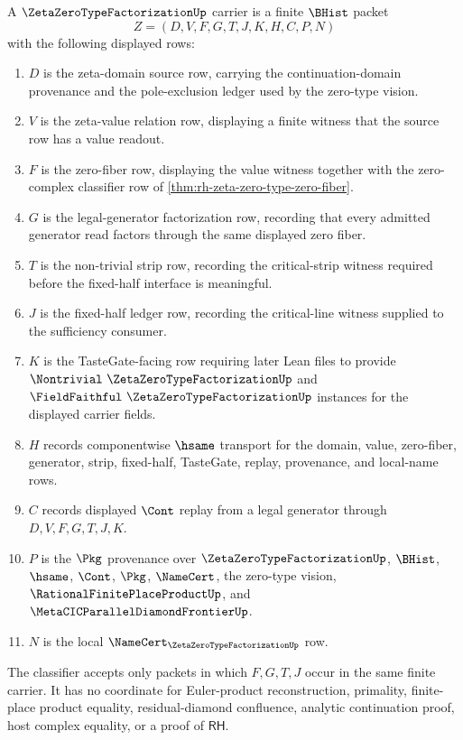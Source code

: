 \begin{definition}
\label{def:zeta-zero-type-factorization-carrier}
A $\ZetaZeroTypeFactorizationUp$ carrier is a finite $\BHist$ packet
$$
Z=(D,V,F,G,T,J,K,H,C,P,N)
$$
with the following displayed rows:
\begin{enumerate}
\item $D$ is the zeta-domain source row, carrying the continuation-domain provenance and the pole-exclusion ledger used by the zero-type vision.
\item $V$ is the zeta-value relation row, displaying a finite witness that the source row has a value readout.
\item $F$ is the zero-fiber row, displaying the value witness together with the zero-complex classifier row of \autoref{thm:rh-zeta-zero-type-zero-fiber}.
\item $G$ is the legal-generator factorization row, recording that every admitted generator read factors through the same displayed zero fiber.
\item $T$ is the non-trivial strip row, recording the critical-strip witness required before the fixed-half interface is meaningful.
\item $J$ is the fixed-half ledger row, recording the critical-line witness supplied to the sufficiency consumer.
\item $K$ is the TasteGate-facing row requiring later Lean files to provide $\Nontrivial\ \ZetaZeroTypeFactorizationUp$ and $\FieldFaithful\ \ZetaZeroTypeFactorizationUp$ instances for the displayed carrier fields.
\item $H$ records componentwise $\hsame$ transport for the domain, value, zero-fiber, generator, strip, fixed-half, TasteGate, replay, provenance, and local-name rows.
\item $C$ records displayed $\Cont$ replay from a legal generator through $D,V,F,G,T,J,K$.
\item $P$ is the $\Pkg$ provenance over $\ZetaZeroTypeFactorizationUp$, $\BHist$, $\hsame$, $\Cont$, $\Pkg$, $\NameCert$, the zero-type vision, $\RationalFinitePlaceProductUp$, and $\MetaCICParallelDiamondFrontierUp$.
\item $N$ is the local $\NameCert_{\ZetaZeroTypeFactorizationUp}$ row.
\end{enumerate}
The classifier accepts only packets in which $F,G,T,J$ occur in the same finite carrier. It has no coordinate for Euler-product reconstruction, primality, finite-place product equality, residual-diamond confluence, analytic continuation proof, host complex equality, or a proof of $\mathsf{RH}$.
\end{definition}

